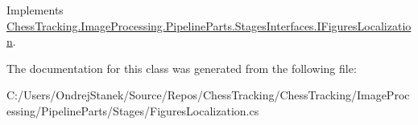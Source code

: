 Implements \mbox{\hyperlink{interface_chess_tracking_1_1_image_processing_1_1_pipeline_parts_1_1_stages_interfaces_1_1_i_figures_localization_aaa05ccf9e70cdf5a9f11dc967cfb2d39}{Chess\+Tracking.\+Image\+Processing.\+Pipeline\+Parts.\+Stages\+Interfaces.\+I\+Figures\+Localization}}.



The documentation for this class was generated from the following file\+:\begin{DoxyCompactItemize}
\item 
C\+:/\+Users/\+Ondrej\+Stanek/\+Source/\+Repos/\+Chess\+Tracking/\+Chess\+Tracking/\+Image\+Processing/\+Pipeline\+Parts/\+Stages/Figures\+Localization.\+cs\end{DoxyCompactItemize}

